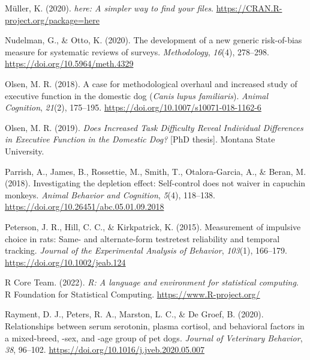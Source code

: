 \documentclass[
  ,pub,floatsintext]{apa6}
\newlength{\cslhangindent}
\newlength{\cslentryspacingunit} %
\newenvironment{CSLReferences}[2] %
 {%
  \setlength{\parindent}{0pt}
  \ifodd #1
  \let\oldpar\par
  \def\par{\hangindent=\cslhangindent\oldpar}
  \fi
  \setlength{\parskip}{#2\cslentryspacingunit}
 }%
 {}
\begin{document}
\begin{CSLReferences}{1}{0}
\leavevmode{}%
Müller, K. (2020). \emph{{here}: A simpler way to find your files}. \url{https://CRAN.R-project.org/package=here}

\leavevmode{}%
Nudelman, G., \& Otto, K. (2020). The development of a new generic risk-of-bias measure for systematic reviews of surveys. \emph{Methodology}, \emph{16}(4), 278--298. \url{https://doi.org/10.5964/meth.4329}

\leavevmode{}%
Olsen, M. R. (2018). A case for methodological overhaul and increased study of executive function in the domestic dog ({\emph{Canis}}{ \emph{lupus familiaris}}). \emph{Animal Cognition}, \emph{21}(2), 175--195. \url{https://doi.org/10.1007/s10071-018-1162-6}

\leavevmode{}%
Olsen, M. R. (2019). \emph{Does {Increased Task Difficulty Reveal Individual Differences} in {Executive Function} in the {Domestic Dog}?} {[}PhD thesis{]}. Montana State University.

\leavevmode{}%
Parrish, A., James, B., Rossettie, M., Smith, T., Otalora-Garcia, A., \& Beran, M. (2018). Investigating the depletion effect: {Self-control} does not waiver in capuchin monkeys. \emph{Animal Behavior and Cognition}, \emph{5}(4), 118--138. \url{https://doi.org/10.26451/abc.05.01.09.2018}

\leavevmode{}%
Peterson, J. R., Hill, C. C., \& Kirkpatrick, K. (2015). Measurement of impulsive choice in rats: Same- and alternate-form test\textendash retest reliability and temporal tracking. \emph{Journal of the Experimental Analysis of Behavior}, \emph{103}(1), 166--179. \url{https://doi.org/10.1002/jeab.124}

\leavevmode{}%
R Core Team. (2022). \emph{R: A language and environment for statistical computing}. R Foundation for Statistical Computing. \url{https://www.R-project.org/}

\leavevmode{}%
Rayment, D. J., Peters, R. A., Marston, L. C., \& De Groef, B. (2020). Relationships between serum serotonin, plasma cortisol, and behavioral factors in a mixed-breed, -sex, and -age group of pet dogs. \emph{Journal of Veterinary Behavior}, \emph{38}, 96--102. \url{https://doi.org/10.1016/j.jveb.2020.05.007}


\end{CSLReferences}
\end{document}

